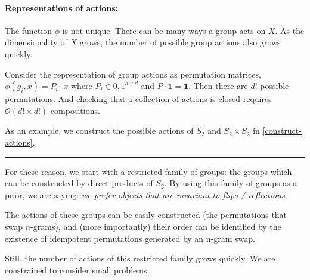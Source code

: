 
\paragraph{Representations of actions:} The function $\phi$ is not unique. There can be many ways
a group acts on $X$. As the dimensionality of $X$ grows, the number of possible group actions also grows quickly.


Consider the representation of group actions as permutation matrices, $\phi(g_i, x) = P_i \cdot x$ where $P_i \in {0, 1}^{d\times d}$ and $P \cdot \mathbf 1 = \mathbf 1$.
Then there are $d!$ possible permutations.
 And checking that a collection of actions is closed requires $\mathcal O(d! \times d!)$ compositions.\footnotemark

 As an example, we construct the possible actions of $S_2$ and $S_2 \times S_2$ in \ref{construct-actions}.



\begin{center}\rule{0.5\linewidth}{\linethickness}\end{center}

For these reason, we start with a restricted family of groups:
the groups which can be constructed by direct products of $S_2$.
By using this family of groups as a prior, we are saying: \textit{we prefer objects that are invariant to flips / reflections}.

The actions of these groups can be easily constructed (the permutations that swap $n$-grams\footnotemark), and (more importantly)
their order can be identified by the existence of idempotent permutations generated by an n-gram swap.


Still, the number of actions of this restricted family grows quickly. We are constrained to consider small problems.

